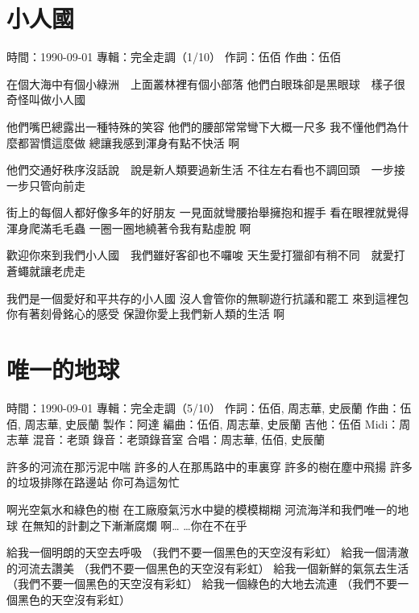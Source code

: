 \documentclass[UTF8,a4paper,oneside,twocolumn,12pt]{ctexbook}
\newcommand{\infopair}[2]{\textbullet #1：#2}
\newcommand{\zc}[1][伍佰]{\infopair{作詞}{#1}}
\newcommand{\zq}[1][伍佰]{\infopair{作曲}{#1}}
\newcommand{\bq}[1][伍佰]{\infopair{編曲}{#1}}
\newcommand{\zj}[1]{\infopair{專輯}{#1}}
\newcommand{\zz}[1]{\infopair{製作}{#1}}
\newcommand{\sj}[1]{\infopair{時間}{#1}}
\newenvironment{info}{\begin{flushleft}\kaishu
	}
	{\end{flushleft}\normalsize\yahei\par}
\newenvironment{lyric}{
	}
{}
\begin{document}
\section{小人國}
\begin{info}
	\sj{1990-09-01}
	\zj{完全走調（1/10）}
	\zc
	\zq
\end{info}
\begin{lyric}
	在個大海中有個小綠洲　上面叢林裡有個小部落
	他們白眼珠卻是黑眼球　樣子很奇怪叫做小人國

	他們嘴巴總露出一種特殊的笑容
	他們的腰部常常彎下大概一尺多
	我不懂他們為什麼都習慣這麼做
	總讓我感到渾身有點不快活
	啊

	他們交通好秩序沒話說　說是新人類要過新生活
	不往左右看也不調回頭　一步接一步只管向前走

	街上的每個人都好像多年的好朋友
	一見面就彎腰抬舉擁抱和握手
	看在眼裡就覺得渾身爬滿毛毛蟲
	一圈一圈地繞著令我有點虛脫
	啊

	歡迎你來到我們小人國　我們雖好客卻也不囉唆
	天生愛打獵卻有稍不同　就愛打蒼蠅就讓老虎走

	我們是一個愛好和平共存的小人國
	沒人會管你的無聊遊行抗議和罷工
	來到這裡包你有著刻骨銘心的感受
	保證你愛上我們新人類的生活
	啊
\end{lyric}

\section{唯一的地球}
\begin{info}
	\sj{1990-09-01}
	\zj{完全走調（5/10）}
	\zc[伍佰, 周志華, 史辰蘭]
	\zq[伍佰, 周志華, 史辰蘭]
	\zz{阿達}
	\bq[伍佰, 周志華, 史辰蘭]
	\infopair{吉他}{伍佰}
	\infopair{Midi}{周志華}
	\infopair{混音}{老頭}
	\infopair{錄音}{老頭錄音室}
	\infopair{合唱}{周志華, 伍佰, 史辰蘭}
\end{info}
\begin{lyric}
	許多的河流在那污泥中喘
	許多的人在那馬路中的車裏穿
	許多的樹在塵中飛揚
	許多的垃圾排隊在路邊站
	你可為這匆忙

	啊光空氣水和綠色的樹
	在工廠廢氣污水中變的模模糊糊
	河流海洋和我們唯一的地球
	在無知的計劃之下漸漸腐爛
	啊… …你在不在乎

	給我一個明朗的天空去呼吸 （我們不要一個黑色的天空沒有彩虹）
	給我一個淸澈的河流去讚美 （我們不要一個黑色的天空沒有彩虹）
	給我一個新鮮的氣氛去生活 （我們不要一個黑色的天空沒有彩虹）
	給我一個綠色的大地去流連 （我們不要一個黑色的天空沒有彩虹）
\end{lyric}
\end{document}
